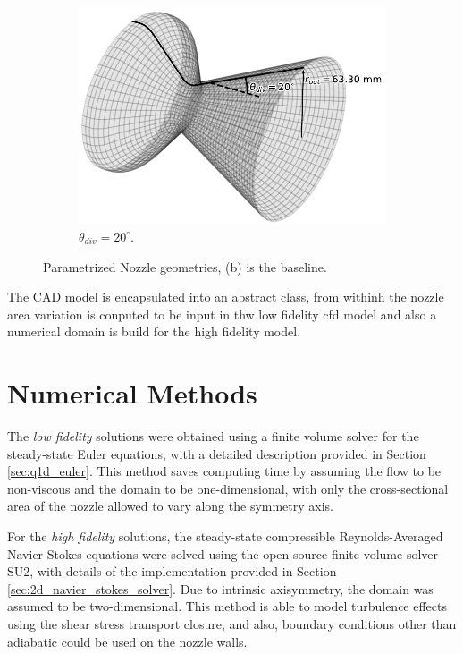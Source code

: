 \begin{figure}[t]
\begin{subfigure}{0.3\textwidth}
        \includegraphics[width=\linewidth]{Figuras/geometry_figures/nozzle_20.pdf}  
        \caption{$\theta_{div}=20^{\circ}$.\label{fig:nozzle_20}}
    \end{subfigure}
    \caption{Parametrized Nozzle geometries, (b) is the baseline.}
\end{figure}

The CAD model is encapsulated into an abstract class, from withinh the nozzle area variation is conputed to be input in thw low fidelity cfd model and also a numerical domain is build for the high fidelity model.

\section{Numerical Methods}

The \textit{low fidelity} solutions  were obtained using a finite volume solver for the steady-state Euler equations, with a detailed description provided in Section \ref{sec:q1d_euler}. This method saves computing time by assuming the flow to be non-viscous and the domain to be one-dimensional, with only the cross-sectional area of the nozzle allowed to vary along the symmetry axis.

For the \textit{high fidelity} solutions, the steady-state compressible Reynolds-Averaged Navier-Stokes equations were solved using the open-source finite volume solver SU2, with details of the implementation provided in Section \ref{sec:2d_navier_stokes_solver}. Due to intrinsic axisymmetry, the domain was assumed to be two-dimensional. This method is able to model turbulence effects using the shear stress transport closure, and also, boundary conditions other than adiabatic could be used on the nozzle walls.

